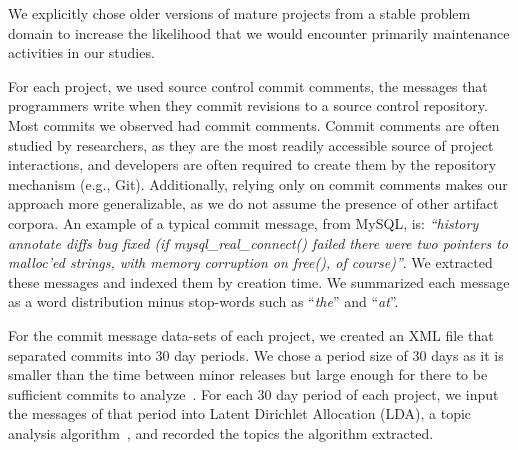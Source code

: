 \documentclass[smallextended]{svjour3}       %
\begin{document}
We explicitly chose older versions of mature projects from a stable problem domain to increase the likelihood that we would encounter primarily
maintenance activities in our studies.

For each project, we used source control commit comments, the messages
that programmers write when they commit revisions to a source control
repository. 
Most commits we observed had commit comments.
Commit comments are often studied by researchers, as they are the most readily accessible source of project interactions, and developers are often
required to create them by the repository mechanism (e.g., Git).  Additionally, relying only on commit comments makes our approach more generalizable,
as we do not assume the presence of other artifact corpora.
An example of a typical commit message, from MySQL, is: \textit{``history annotate diffs bug fixed (if mysql\-\_real\-\_connect() failed there were
two pointers to malloc'ed strings, with memory corruption on free(), of course)''}. 
We extracted these messages and indexed them by creation time. 
We summarized each message as a word distribution minus stop-words such as ``\emph{the}'' and ``\emph{at}''. 

For the commit message data-sets of each project, we created an XML file that separated commits into 30 day periods. 
We chose a period size of 30 days as it is smaller than the time between minor releases but large enough for there to be sufficient commits to
analyze~\cite{Hindle09ICSM}. 
For each 30 day period of each project, we input the messages of that period into Latent Dirichlet Allocation (LDA), a topic analysis
algorithm~\cite{Blei2003}, and recorded the topics the algorithm extracted.
\end{document}
